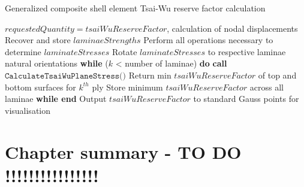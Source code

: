 \begin{algorithm}
	\onehalfspacing
	\caption{Generalized composite shell element Tsai-Wu reserve factor calculation}
	\label{general composite shell tsai pseudocode}
	\begin{algorithmic}[1]
		\Require $requestedQuantity = tsaiWuReserveFactor$, calculation of nodal displacements
		\State Recover and store $laminaeStrengths$
		\State Perform all operations necessary to determine $laminateStresses$
		\State Rotate $laminateStresses$ to respective laminae natural orientations
		\State \hspace{\algorithmicindent}\textbf{while} ($k$ < number of laminae) \textbf{do}
		\State \hspace{\algorithmicindent}\hspace{\algorithmicindent}\textbf{call} $\texttt{CalculateTsaiWuPlaneStress()}$
		\State \hspace{\algorithmicindent}\hspace{\algorithmicindent}\hspace{\algorithmicindent}Return min $tsaiWuReserveFactor$ of top and bottom surfaces for $k^{th}$ ply
		\State \hspace{\algorithmicindent} \hspace{\algorithmicindent}Store minimum $tsaiWuReserveFactor$ across all laminae
		\State \hspace{\algorithmicindent}\textbf{while end}
		\State Output $tsaiWuReserveFactor$ to standard Gauss points for visualisation
		\EndWhile
	\end{algorithmic}
\end{algorithm}

\section{Chapter summary - TO DO !!!!!!!!!!!!!!!!}